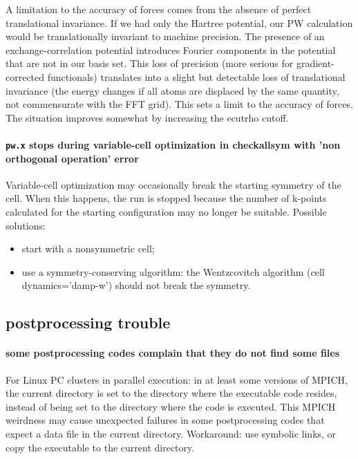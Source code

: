 \documentclass[12pt,a4paper]{article}
\def\pw.x{\texttt{pw.x}}
\begin{document}
A limitation to the accuracy of forces comes from the absence of perfect
translational invariance. If we had only the Hartree potential, our PW
calculation would be translationally invariant to machine
precision. The presence of an exchange-correlation potential
introduces Fourier components in the potential that are not in our
basis set. This loss of precision (more serious for gradient-corrected
functionals) translates into a slight but detectable loss 
of translational invariance (the energy changes if all atoms are displaced by
the same quantity, not commensurate with the FFT grid). This sets a limit
to the accuracy of forces. The situation improves somewhat by increasing
the ecutrho cutoff.

\paragraph{\pw.x stops during variable-cell optimization in
  checkallsym with 'non orthogonal operation' error} 
Variable-cell optimization may occasionally break the starting
symmetry of the cell. When this happens, the run is stopped because
the number of k-points calculated for the starting configuration may
no longer be suitable. Possible solutions: 
\begin{itemize}
\item start with a nonsymmetric cell;
\item use a symmetry-conserving algorithm: the Wentzcovitch algorithm
  (cell dynamics='damp-w') should not break the symmetry. 
\end{itemize}

\subsection{postprocessing trouble}

\paragraph{some postprocessing codes complain that they do not find some files}
For Linux PC clusters in parallel execution: in at least some versions
of MPICH, the current directory is set to the directory where the executable
code resides, instead of being set to the directory where the code is executed.
This MPICH weirdness may cause unexpected failures in some postprocessing
codes that expect a data file in the current directory. Workaround: use
symbolic links, or copy the executable to the current directory.
\end{document}
